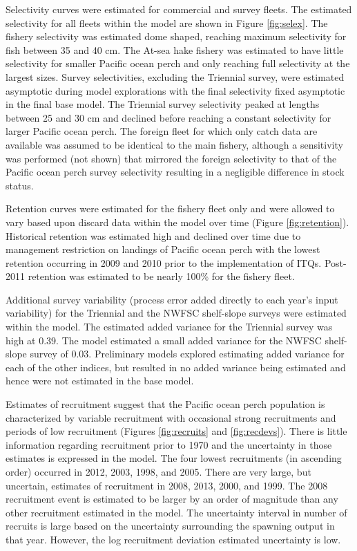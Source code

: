 \documentclass[12pt,]{article}
\begin{document}
Selectivity curves were estimated for commercial and survey fleets. The
estimated selectivity for all fleets within the model are shown in
Figure \ref{fig:selex}. The fishery selectivity was estimated dome
shaped, reaching maximum selectivity for fish between 35 and 40 cm. The
At-sea hake fishery was estimated to have little selectivity for smaller
Pacific ocean perch and only reaching full selectivity at the largest
sizes. Survey selectivities, excluding the Triennial survey, were
estimated asymptotic during model explorations with the final
selectivity fixed asymptotic in the final base model. The Triennial
survey selectivity peaked at lengths between 25 and 30 cm and declined
before reaching a constant selectivity for larger Pacific ocean perch.
The foreign fleet for which only catch data are available was assumed to
be identical to the main fishery, although a sensitivity was performed
(not shown) that mirrored the foreign selectivity to that of the Pacific
ocean perch survey selectivity resulting in a negligible difference in
stock status.

Retention curves were estimated for the fishery fleet only and were
allowed to vary based upon discard data within the model over time
(Figure \ref{fig:retention}). Historical retention was estimated high
and declined over time due to management restriction on landings of
Pacific ocean perch with the lowest retention occurring in 2009 and 2010
prior to the implementation of ITQs. Post-2011 retention was estimated
to be nearly 100\% for the fishery fleet.

Additional survey variability (process error added directly to each
year's input variability) for the Triennial and the NWFSC shelf-slope
surveys were estimated within the model. The estimated added variance
for the Triennial survey was high at 0.39. The model estimated a small
added variance for the NWFSC shelf-slope survey of 0.03. Preliminary
models explored estimating added variance for each of the other indices,
but resulted in no added variance being estimated and hence were not
estimated in the base model.

Estimates of recruitment suggest that the Pacific ocean perch population
is characterized by variable recruitment with occasional strong
recruitments and periods of low recruitment (Figures \ref{fig:recruits}
and \ref{fig:recdevs}). There is little information regarding
recruitment prior to 1970 and the uncertainty in those estimates is
expressed in the model. The four lowest recruitments (in ascending
order) occurred in 2012, 2003, 1998, and 2005. There are very large, but
uncertain, estimates of recruitment in 2008, 2013, 2000, and 1999. The
2008 recruitment event is estimated to be larger by an order of
magnitude than any other recruitment estimated in the model. The
uncertainty interval in number of recruits is large based on the
uncertainty surrounding the spawning output in that year. However, the
log recruitment deviation estimated uncertainty is low.
\end{document}
